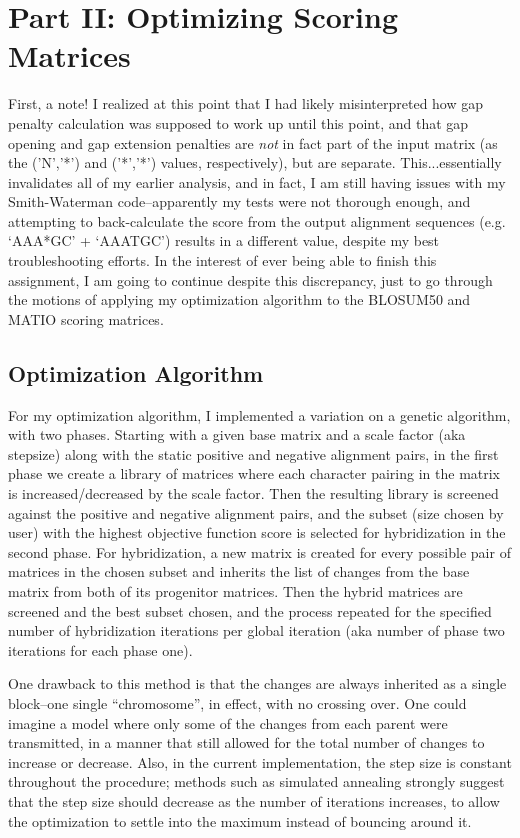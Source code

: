\documentclass{article}
\begin{document}
\section{Part II: Optimizing Scoring Matrices}

First, a note! I realized at this point that I had likely misinterpreted how gap penalty calculation was supposed to work up until this point, and that gap opening and gap extension penalties are {\it not} in fact part of the input matrix (as the ('N','*') and ('*','*') values, respectively), but are separate. This...essentially invalidates all of my earlier analysis, and in fact, I am still having issues with my Smith-Waterman code--apparently my tests were not thorough enough, and attempting to back-calculate the score from the output alignment sequences (e.g. `AAA*GC' + `AAATGC') results in a different value, despite my best troubleshooting efforts. In the interest of ever being able to finish this assignment, I am going to continue despite this discrepancy, just to go through the motions of applying my optimization algorithm to the BLOSUM50 and MATIO scoring matrices. 

\subsection{Optimization Algorithm}

For my optimization algorithm, I implemented a variation on a genetic algorithm, with two phases. Starting with a given base matrix and a scale factor (aka stepsize) along with the static positive and negative alignment pairs, in the first phase we create a library of matrices where each character pairing in the matrix is increased/decreased by the scale factor. Then the resulting library is screened against the positive and negative alignment pairs, and the subset (size chosen by user) with the highest objective function score is selected for hybridization in the second phase. For hybridization, a new matrix is created for every possible pair of matrices in the chosen subset and inherits the list of changes from the base matrix from both of its progenitor matrices. Then the hybrid matrices are screened and the best subset chosen, and the process repeated for the specified number of hybridization iterations per global iteration (aka number of phase two iterations for each phase one).
\par One drawback to this method is that the changes are always inherited as a single block--one single ``chromosome'', in effect, with no crossing over. One could imagine a model where only some of the changes from each parent were transmitted, in a manner that still allowed for the total number of changes to increase or decrease. Also, in the current implementation, the step size is constant throughout the procedure; methods such as simulated annealing strongly suggest that the step size should decrease as the number of iterations increases, to allow the optimization to settle into the maximum instead of bouncing around it.
\end{document}
